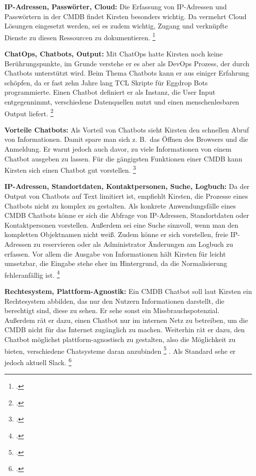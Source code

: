 \textbf{IP-Adressen, Passwörter, Cloud: }Die Erfassung von IP-Adressen und Passwörtern in der \acs{CMDB} findet Kirsten besonders wichtig. Da vermehrt Cloud Lösungen eingesetzt werden, sei es zudem wichtig, Zugang und verknüpfte Dienste zu diesen Ressourcen zu dokumentieren.
\footcite[Vgl.][o. \pno]{Kirsten_2019}

\textbf{ChatOps, Chatbots, Output: }Mit ChatOps hatte Kirsten noch keine Berührungspunkte, im Grunde verstehe er es aber als DevOps Prozess, der durch Chatbots unterstützt wird.  Beim Thema Chatbots kann er aus einiger Erfahrung schöpfen, da er fast zehn Jahre lang TCL Skripte für Eggdrop Bots programmierte. Einen Chatbot definiert er als Instanz, die User Input entgegennimmt, verschiedene Datenquellen nutzt und einen menschenlesbaren Output liefert.
\footcite[Vgl.][o. \pno]{Kirsten_2019}

\textbf{Vorteile Chatbots: }Als Vorteil von Chatbots sieht Kirsten den schnellen Abruf von Informationen. Damit spare man sich z. B.~das Öffnen des Browsers und die Anmeldung. Er warnt jedoch auch davor, zu viele Informationen von einem Chatbot ausgeben zu lassen. Für die gängigsten Funktionen einer \acs{CMDB} kann Kirsten sich einen Chatbot gut vorstellen. 
\footcite[Vgl.][o. \pno]{Kirsten_2019}

\textbf{IP-Adressen, Standortdaten, Kontaktpersonen, Suche, Logbuch: }Da der Output von Chatbots auf Text limitiert ist, empfiehlt Kirsten, die Prozesse eines Chatbots nicht zu komplex zu gestalten. Als konkrete Anwendungsfälle eines \acs{CMDB} Chatbots könne er sich die Abfrage von IP-Adressen, Standortdaten oder Kontaktpersonen vorstellen. Außerdem sei eine Suche sinnvoll, wenn man den kompletten Objektnamen nicht weiß. Zudem könne er sich vorstellen, freie IP-Adressen zu reservieren oder als Administrator Änderungen am Logbuch zu erfassen. Vor allem die Ausgabe von Informationen hält Kirsten für leicht umsetzbar, die Eingabe stehe eher im Hintergrund, da die Normalisierung fehleranfällig ist.
\footcite[Vgl.][o. \pno]{Kirsten_2019}

\textbf{Rechtesystem, Plattform-Agnostik: }Ein \acs{CMDB} Chatbot soll laut Kirsten ein Rechtesystem abbilden, das nur den Nutzern Informationen darstellt, die berechtigt sind, diese zu sehen. Er sehe sonst ein Missbrauchspotenzial. Außerdem rät er dazu, einen Chatbot nur im internen Netz zu betreiben, um die \acs{CMDB} nicht für das Internet zugänglich zu machen. Weiterhin rät er dazu, den Chatbot möglichst plattform-agnostisch zu gestalten, also die Möglichkeit zu bieten, \glqq{}verschiedene Chatsysteme daran anzubinden\grqq
\footcite[][o. \pno]{Kirsten_2019}
. Als Standard sehe er jedoch aktuell Slack.
\footcite[Vgl.][o. \pno]{Kirsten_2019}

